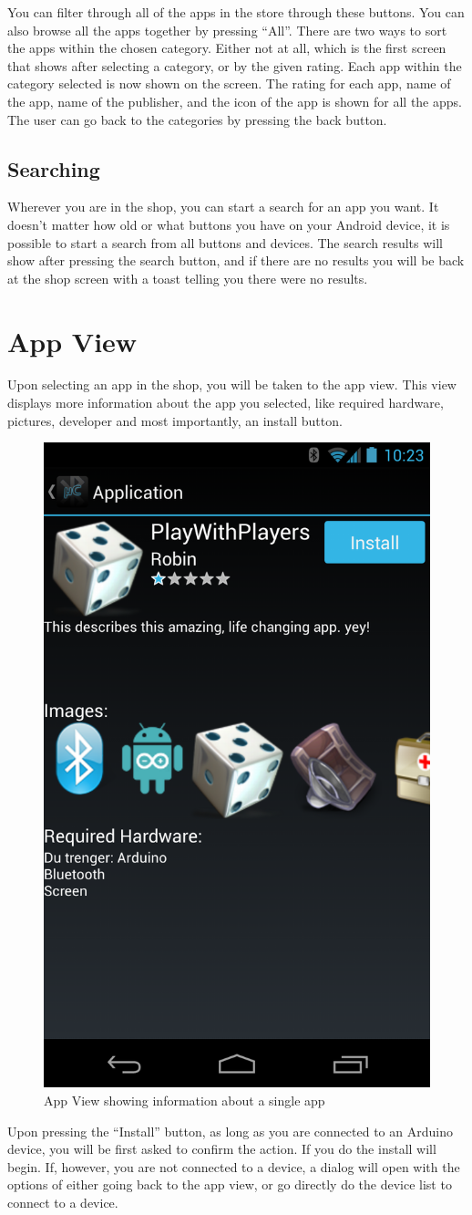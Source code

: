 		You can filter through all of the apps in the store through these buttons. You can also browse all the apps together by pressing ``All''. There are two ways to sort the apps within the chosen category. Either not at all, which is the first screen that shows after selecting a category, or by the given rating. Each app within the category selected is now shown on the screen. The rating for each app, name of the app, name of the publisher, and the icon of the app is shown for all the apps. The user can go back to the categories by pressing the back button. \\

		\subsection{Searching}
			Wherever you are in the shop, you can start a search for an app you want. It doesn't matter how old or what buttons you have on your Android device, it is possible to start a search from all buttons and devices. The search results will show after pressing the search button, and if there are no results you will be back at the shop screen with a toast telling you there were no results.

	\section{App View}
	Upon selecting an app in the shop, you will be taken to the app view. This view displays more information about the app you selected, like required hardware, pictures, developer and most importantly, an install button. 
	\newline
	\begin{figure}[H]
		\centering
		\includegraphics[width=0.5 \textwidth]{images/Screenshots/app_view.png}
		\caption{App View showing information about a single app}
	\end{figure}
	Upon pressing the ``Install'' button, as long as you are connected to an Arduino device, you will be first asked to confirm the action. If you do the install will begin. If, however, you are not connected to a device, a dialog will open with the options of either going back to the app view, or go directly do the device list to connect to a device.
\newpage
